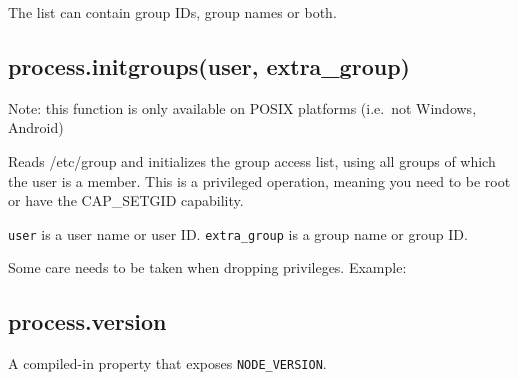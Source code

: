 The list can contain group IDs, group names or both.

\subsection{process.initgroups(user,
extra\_group)}\label{process.initgroupsuser-extraux5fgroup}

Note: this function is only available on POSIX platforms (i.e.~not
Windows, Android)

Reads /etc/group and initializes the group access list, using all groups
of which the user is a member. This is a privileged operation, meaning
you need to be root or have the CAP\_SETGID capability.

\texttt{user} is a user name or user ID. \texttt{extra\_group} is a
group name or group ID.

Some care needs to be taken when dropping privileges. Example:

\begin{Shaded}
\begin{Highlighting}[]
\NormalTok{(}\NormalTok{());         }\CommentTok{// [ 0 ]}
\NormalTok{(}\NormalTok{, }\NormalTok{);   }
\NormalTok{(}\NormalTok{());         }\CommentTok{// [ 27, 30, 46, 1000, 0 ]}
\NormalTok{(}\NormalTok{);                     }
\NormalTok{(}\NormalTok{());         }\CommentTok{// [ 27, 30, 46, 1000 ]}
\end{Highlighting}
\end{Shaded}

\subsection{process.version}\label{process.version}

A compiled-in property that exposes \texttt{NODE\_VERSION}.

\begin{Shaded}
\begin{Highlighting}[]
\NormalTok{(} \NormalTok{+ }\NormalTok{);}
\end{Highlighting}
\end{Shaded}

